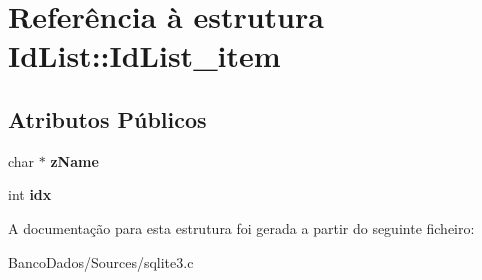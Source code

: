 \hypertarget{struct_id_list_1_1_id_list__item}{\section{Referência à estrutura Id\-List\-:\-:Id\-List\-\_\-item}
\label{struct_id_list_1_1_id_list__item}
}
\subsection*{Atributos Públicos}
\begin{DoxyCompactItemize}
\item 
\hypertarget{struct_id_list_1_1_id_list__item_acd44e1182dc46441939cd6a5d935724c}{char $\ast$ {\bfseries z\-Name}}\label{struct_id_list_1_1_id_list__item_acd44e1182dc46441939cd6a5d935724c}

\item 
\hypertarget{struct_id_list_1_1_id_list__item_a869d1a5ee03bcb018e38fae6c9ac0572}{int {\bfseries idx}}\label{struct_id_list_1_1_id_list__item_a869d1a5ee03bcb018e38fae6c9ac0572}

\end{DoxyCompactItemize}


A documentação para esta estrutura foi gerada a partir do seguinte ficheiro\-:\begin{DoxyCompactItemize}
\item 
Banco\-Dados/\-Sources/sqlite3.\-c\end{DoxyCompactItemize}
